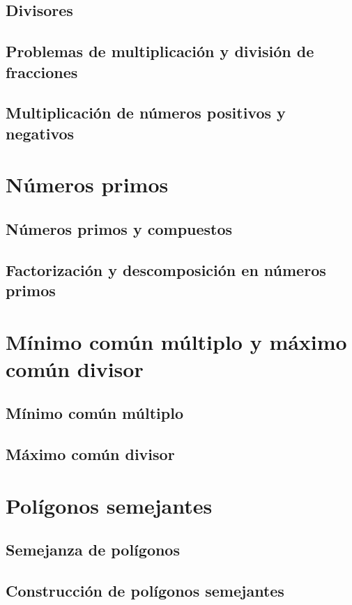 \documentclass[11pt]{book}
\begin{document}
\subsection{Divisores}
\subsection{Problemas de multiplicación y división de fracciones}
\subsection{Multiplicación de números positivos y negativos}

\section{Números primos}
\subsection{Números primos y compuestos}
\subsection{Factorización y descomposición en números primos}

\section{Mínimo común múltiplo y máximo común divisor}
\subsection{Mínimo común múltiplo}
\subsection{Máximo común divisor}

\section{Polígonos semejantes}
\subsection{Semejanza de polígonos}
\subsection{Construcción de polígonos semejantes}
\end{document}
